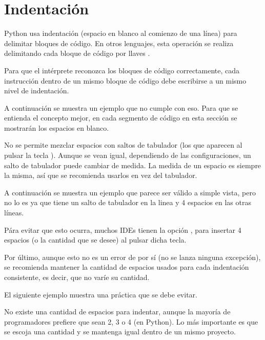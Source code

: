 \section{Indentación}

Python usa indentación (espacio en blanco al comienzo de una línea) para delimitar bloques de código. En otros lenguajes, esta operación se realiza delimitando cada bloque de código por llaves \ttt{\{\}}.\smallskip

Para que el intérprete reconozca los bloques de código correctamente, cada instrucción dentro de un mismo bloque de código debe escribirse a un mismo nivel de indentación.\smallskip

A continuación se muestra un ejemplo que no cumple con eso. Para que se entienda el concepto mejor, en cada segmento de código en esta sección se mostrarán los espacios en blanco.


No se permite mezclar espacios con saltos de tabulador (los que aparecen al pulsar la tecla ). Aunque se vean igual, dependiendo de las configuraciones, un salto de tabulador puede cambiar de medida. La medida de un espacio es siempre la misma, así que se recomienda usarlos en vez del tabulador.\smallskip

A continuación se muestra un ejemplo que parece ser válido a simple vista, pero no lo es ya que tiene un salto de tabulador en la linea  y 4 espacios en las otras líneas.


Pára evitar que esto ocurra, muchos IDEs tienen la opción , para insertar 4 espacios (o la cantidad que se desee) al pulsar dicha tecla.\smallskip

Por último, aunque esto no es un error de por sí (no se lanza ninguna excepción), se recomienda mantener la cantidad de espacios usados para cada indentación consistente, es decir, que no varíe su cantidad.\smallskip

El siguiente ejemplo muestra una práctica que se debe evitar.


No existe una cantidad  de espacios para indentar, aunque la mayoría de programadores prefiere que sean 2, 3 o 4 (en Python). Lo más importante es que se escoja una cantidad y se mantenga igual dentro de un mismo proyecto.\smallskip

